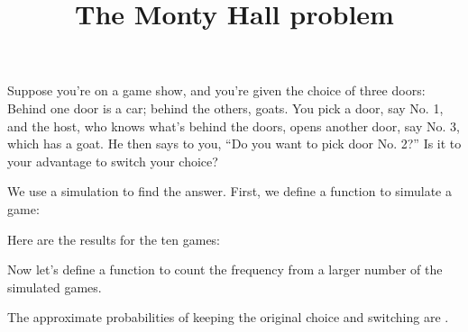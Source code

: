 \documentclass[12pt]{article}
\renewcommand{\runR}[2]{}
\newcommand{\includeR}[1]{}
\renewcommand{\inlnR}[1]{}
\renewcommand{\inlnR}[1]{}
\renewcommand{\runJulia}[2]{}
\newcommand{\includeJulia}[1]{}
\renewcommand{\inlnJulia}[1]{}
\begin{document}
\title{The Monty Hall problem}
\maketitle

Suppose you're on a game show, and you're given the choice of three doors:
Behind one door is a car; behind the others, goats. You pick a door, say No. 1,
and the host, who knows what's behind the doors, opens another door, say No. 3,
which has a goat. He then says to you, ``Do you want to pick door No. 2?'' Is it
to your advantage to switch your choice?

We use a simulation to find the answer. First, we define a function to simulate
a game:
\runJulia{code/MontyHall_1.jl}{montyhall-J1}

\runR{code/MontyHall_1.R}{montyhall-R1}

Here are the results for the ten games:
\includeJulia{montyhall-J1}
\includeR{montyhall-R1}

Now let's define a function to count the frequency from a larger number of the
simulated games.
\runJulia{code/MontyHall_2.jl}{montyhall-J2}

\runR{code/MontyHall_2.R}{montyhall-R2}

The approximate probabilities of keeping the original choice and switching are \inlnR{```cat(probabilities)```}\inlnJulia{```print(probabilities)```}.
\end{document}
